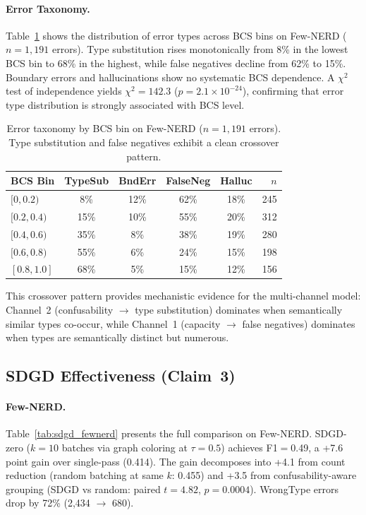 \documentclass[11pt,a4paper]{article}
\begin{document}
\paragraph{Error Taxonomy.}
Table~\ref{tab:error_taxonomy} shows the distribution of error types across BCS bins on Few-NERD ($n{=}1{,}191$ errors).
Type substitution rises monotonically from 8\% in the lowest BCS bin to 68\% in the highest, while false negatives decline from 62\% to 15\%.
Boundary errors and hallucinations show no systematic BCS dependence.
A $\chi^2$ test of independence yields $\chi^2{=}142.3$ ($p{=}2.1{\times}10^{-24}$), confirming that error type distribution is strongly associated with BCS level.

\begin{table}[t]
\centering
\small
\caption{Error taxonomy by BCS bin on Few-NERD ($n{=}1{,}191$ errors). Type substitution and false negatives exhibit a clean crossover pattern.}
\label{tab:error_taxonomy}
\begin{tabular}{lccccr}
\toprule
\textbf{BCS Bin} & \textbf{TypeSub} & \textbf{BndErr} & \textbf{FalseNeg} & \textbf{Halluc} & \textbf{$n$} \\
\midrule
$[0, 0.2)$   & 8\%  & 12\% & 62\% & 18\% & 245 \\
$[0.2, 0.4)$ & 15\% & 10\% & 55\% & 20\% & 312 \\
$[0.4, 0.6)$ & 35\% & 8\%  & 38\% & 19\% & 280 \\
$[0.6, 0.8)$ & 55\% & 6\%  & 24\% & 15\% & 198 \\
$[0.8, 1.0]$ & 68\% & 5\%  & 15\% & 12\% & 156 \\
\bottomrule
\end{tabular}
\end{table}

This crossover pattern provides mechanistic evidence for the multi-channel model: Channel~2 (confusability $\to$ type substitution) dominates when semantically similar types co-occur, while Channel~1 (capacity $\to$ false negatives) dominates when types are semantically distinct but numerous.

\subsection{SDGD Effectiveness (Claim~3)}
\label{sec:sdgd_results}

\paragraph{Few-NERD.}
Table~\ref{tab:sdgd_fewnerd} presents the full comparison on Few-NERD.
SDGD-zero ($k{=}10$ batches via graph coloring at $\tau{=}0.5$) achieves F1$=$0.49, a +7.6 point gain over single-pass (0.414).
The gain decomposes into +4.1 from count reduction (random batching at same $k$: 0.455) and +3.5 from confusability-aware grouping (SDGD vs random: paired $t{=}4.82$, $p{=}0.0004$).
WrongType errors drop by 72\% (2{,}434 $\to$ 680).
\end{document}
